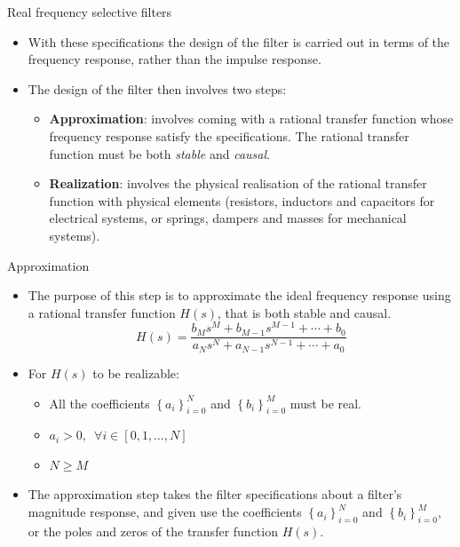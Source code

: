 \documentclass{beamer}
\begin{document}
\begin{frame}{Real frequency selective filters}
\begin{itemize}
\item With these specifications the design of the filter is carried out in terms of the frequency response, rather than the impulse response.
\item The design of the filter then involves two steps:
\begin{itemize}
\item \textbf{Approximation}: involves coming with a rational transfer function whose frequency response satisfy the specifications. The rational transfer function must be both \textit{stable} and \textit{causal}.
\item \textbf{Realization}: involves the physical realisation of the rational transfer function with physical elements (resistors, inductors and capacitors for electrical systems, or springs, dampers and masses for mechanical systems).
\end{itemize}
\end{itemize}
\end{frame}

\begin{frame}{Approximation}
\begin{itemize}
\item The purpose of this step is to approximate the ideal frequency response using a rational transfer function $H(s)$, that is both stable and causal.
\[ H(s) = \frac{b_Ms^M + b_{M-1}s^{M-1} + \cdots + b_0}{a_Ns^N + a_{N-1}s^{N-1} + \cdots + a_0} \]
\item For $H(s)$ to be realizable:
\begin{itemize}
\item All the coefficients $\left\{a_i\right\}_{i=0}^N$ and $\left\{b_i\right\}_{i=0}^M$ must be real.
\item $a_i > 0, \,\,\, \forall i \in \left[0, 1, \ldots, N \right]$
\item $N \geq M$
\end{itemize}
\item The approximation step takes the filter specifications about a filter's magnitude response, and given use the coefficients $\left\{a_i\right\}_{i=0}^N$ and $\left\{b_i\right\}_{i=0}^M$, or the poles and zeros of the transfer function $H(s)$.
\end{itemize}
\end{frame}
\end{document}
